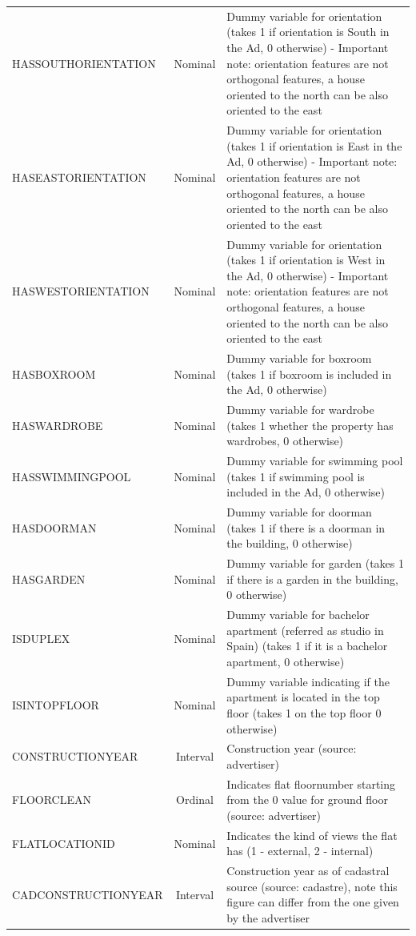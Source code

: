 \documentclass[times,final]{elsarticle}
\begin{document}
\begin{footnotesize}
\begin{longtable}{p{40mm} c p{63mm}}
HASSOUTHORIENTATION & Nominal & Dummy variable for orientation (takes 1 if orientation is South in the Ad, 0 otherwise) - Important note: orientation features are not orthogonal features, a house oriented to the north can be also oriented to the east\\
HASEASTORIENTATION & Nominal & Dummy variable for orientation (takes 1 if orientation is East in the Ad, 0 otherwise) - Important note: orientation features are not orthogonal features, a house oriented to the north can be also oriented to the east\\
HASWESTORIENTATION & Nominal & Dummy variable for orientation (takes 1 if orientation is West in the Ad, 0 otherwise) - Important note: orientation features are not orthogonal features, a house oriented to the north can be also oriented to the east\\
HASBOXROOM & Nominal & Dummy variable for boxroom (takes 1 if boxroom is included in the Ad, 0 otherwise)\\
HASWARDROBE & Nominal & Dummy variable for wardrobe (takes 1 whether the property has wardrobes, 0 otherwise)\\
HASSWIMMINGPOOL & Nominal & Dummy variable for swimming pool (takes 1 if swimming pool is included in the Ad, 0 otherwise)\\
HASDOORMAN & Nominal & Dummy variable for doorman (takes 1 if there is a doorman in the building, 0 otherwise)\\
HASGARDEN & Nominal & Dummy variable for garden (takes 1 if there is a garden in the building, 0 otherwise)\\
ISDUPLEX & Nominal & Dummy variable for bachelor apartment (referred as studio in Spain) (takes 1 if it is a bachelor apartment, 0 otherwise)\\
ISINTOPFLOOR & Nominal & Dummy variable indicating if the apartment is located in the top floor (takes 1 on the top floor 0 otherwise)\\
CONSTRUCTIONYEAR & Interval & Construction year (source: advertiser)\\
FLOORCLEAN & Ordinal & Indicates flat floornumber starting from the 0 value for ground floor (source: advertiser)\\
FLATLOCATIONID & Nominal & Indicates the kind of views the flat has (1 - external, 2 - internal)\\
CADCONSTRUCTIONYEAR & Interval & Construction year as of cadastral source (source: cadastre), note this figure can differ from the one given by the advertiser\\

\end{longtable}
\end{footnotesize}
\end{document}
